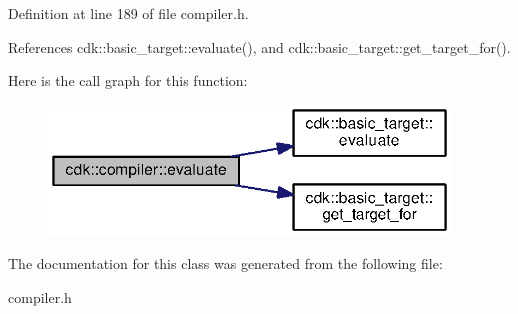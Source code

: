 Definition at line 189 of file compiler.\+h.



References cdk\+::basic\+\_\+target\+::evaluate(), and cdk\+::basic\+\_\+target\+::get\+\_\+target\+\_\+for().



Here is the call graph for this function\+:
\nopagebreak
\begin{figure}[H]
\begin{center}
\leavevmode
\includegraphics[width=302pt]{classcdk_1_1compiler_a0c0d48f8b1101bb17bd1908785d62eff_cgraph}
\end{center}
\end{figure}




The documentation for this class was generated from the following file\+:\begin{DoxyCompactItemize}
\item 
compiler.\+h\end{DoxyCompactItemize}

